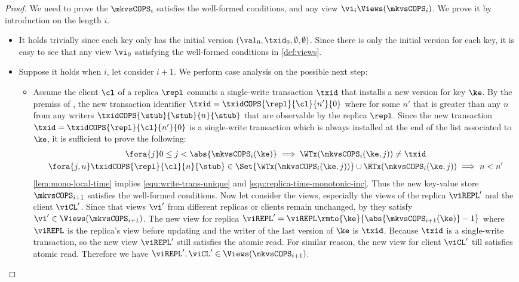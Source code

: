 \begin{proof}
    We need to prove the  \( \mkvsCOPS_i \) satisfies the well-formed conditions,
    and any view \( \vi_i \Views(\mkvsCOPS_i) \).
    We prove it by introduction on the length \( i \).
    \begin{itemize}
    \item {}
        It holds trivially since each key only has the initial version \( (\val_0,\txid_0,\emptyset, \emptyset) \).
        Since there is only the initial version for each key, it is easy to see that any view \( \vi_0 \) satisfying the well-formed conditions in \cref{def:views}.
    \item {}
        Suppose it holds when \( i \), let consider \( i + 1 \).
        We perform case analysis on the possible next step:
        \begin{itemize}
            \item {}
                Assume the client \( \cl \) of a replica \( \repl \) commits a single-write transaction \( \txid \) that installs a new version for key \( \ke \).
                By the premiss of , the new transaction identifier \( \txid = \txidCOPS{\repl}{\cl}{n'}{0} \) where for some \( n' \) that is greater than any \( n \) from any writers \( \txidCOPS{\stub}{\stub}{n}{\stub} \) that are observable by the replica \( \repl \).
                Since the new transaction \( \txid = \txidCOPS{\repl}{\cl}{n'}{0} \) is a single-write transaction which is always installed at the end of the list associated to \( \ke \), it is sufficient to prove the following:
                \begin{gather}
                    \fora{j} 0 \leq j < \abs{ \mkvsCOPS_i(\ke) } \implies \WTx(\mkvsCOPS_{i}(\ke, j)) \neq \txid \label{equ:write-trans-unique} \\
                    \fora{j, n} \txidCOPS{\repl}{\cl}{n}{\stub} \in \Set{\WTx(\mkvsCOPS_{i}(\ke,j))} \cup \RTx(\mkvsCOPS_{i}(\ke, j)) \implies n < n' \label{equ:replica-time-monotonic-inc}
                \end{gather}
                \cref{lem:mono-local-time} implies \cref{equ:write-trans-unique} and \cref{equ:replica-time-monotonic-inc}.
                Thus the new key-value store \( \mkvsCOPS_{i+1} \) satisfies the well-formed conditions.
                Now let consider the views, especially the views of the replica \( \viREPL' \) and the client \( \viCL' \).
                Since that views \( \vi' \) from different replicas or clients remain unchanged, by \ih they satisfy \( \vi' \in \Views(\mkvsCOPS_{i+1}) \).
                The new view for replica \( \viREPL' = \viREPL\rmto{\ke}{\abs{\mkvsCOPS_{i+1}(\ke)} - 1} \)
                where \( \viREPL \) is the replica's view before updating and the writer of the last version of \( \ke \) is \( \txid \).
                Because \( \txid \) is a single-write transaction, so the new view \( \viREPL' \) still satisfies the atomic read.
                For similar reason, the new view for client \( \viCL' \) till satisfies atomic read.
                Therefore we have \( \viREPL', \viCL' \in \Views(\mkvsCOPS_{i+1}) \).


\end{itemize}
\end{itemize}
\end{proof}
